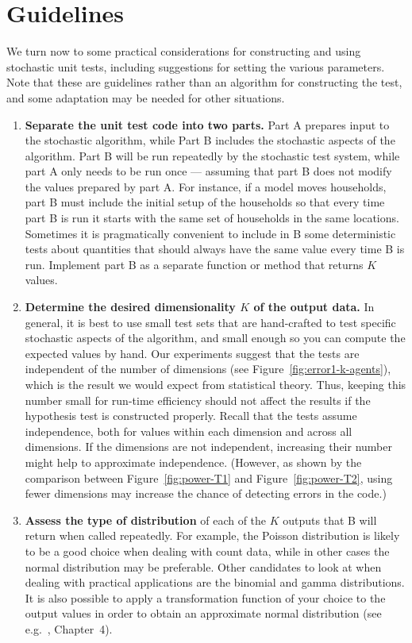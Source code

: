 \documentclass{sig-alternate}
\begin{document}
\section{Guidelines}
\label{sec:guidelines}

We turn now to some practical considerations for constructing and using
stochastic unit tests, including suggestions for setting the various
parameters.  Note that these are guidelines rather than an
algorithm for constructing the test, and some adaptation may be needed for
other situations.

\begin{enumerate}

\item
{\bf Separate the unit test code into two parts.}  Part A prepares input to the
stochastic algorithm, while Part B includes the stochastic aspects of the
algorithm.  Part B will be run repeatedly by the stochastic test system,
while part A only needs to be run once --- assuming that part B does not
modify the values prepared by part A\@.  For instance, if a model moves
households, part B must include the initial setup of the households so that
every time part B is run it starts with the same set of households in the
same locations.  Sometimes it is pragmatically convenient to include in B
some deterministic tests about quantities that should always have the same
value every time B is run.  Implement part B as a separate function or
method that returns $K$ values.

\item
{\bf Determine the desired dimensionality $K$ of the output data.}  In
general, it is best to use small test sets that are hand-crafted to test
specific stochastic aspects of the algorithm, and small enough so you can
compute the expected values by hand.  Our experiments suggest that the
tests are independent of the number of dimensions (see
Figure~\ref{fig:error1-k-agents}), which is the result we would expect from
statistical theory.  Thus, keeping this number small for run-time
efficiency should not affect the results if the hypothesis test is
constructed properly.  Recall that the tests assume independence, both for
values within each dimension and across all dimensions.  If the dimensions
are not independent, increasing their number might help to approximate
independence.  (However, as shown by the comparison between
Figure~\ref{fig:power-T1} and Figure~\ref{fig:power-T2}, using fewer
dimensions may increase the chance of detecting errors in the code.)

\item
\label{assess-type-of-distribution}
{\bf Assess the type of distribution} of each of the $K$ outputs that B will
return when called repeatedly.  For example, the Poisson distribution is
likely to be a good choice when dealing with count data, while in other cases
the normal distribution may be preferable.  Other candidates to look at when
dealing with practical applications are the binomial and gamma
distributions.  It is also possible to apply a transformation function of your
choice to the output values in order to obtain an approximate normal
distribution (see e.g.~\cite{Afifi&2004}, Chapter~4).




\end{enumerate}
\end{document}
